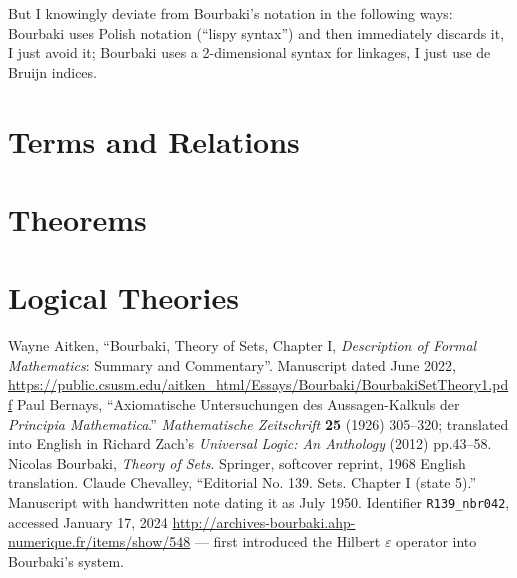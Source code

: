 \documentclass{amsart}
\begin{document}
But I knowingly deviate from Bourbaki's notation in the following ways:
Bourbaki uses Polish notation (``lispy syntax'') and then immediately
discards it, I just avoid it; Bourbaki uses a 2-dimensional syntax for
linkages, I just use de Bruijn indices.

\section{Terms and Relations}






\section{Theorems}





\section{Logical Theories}






\begin{thebibliography}{99}
 Wayne Aitken,
  ``Bourbaki, Theory of Sets, Chapter I, \textit{Description of Formal Mathematics}: Summary and Commentary''.
  Manuscript dated June 2022,
  \url{https://public.csusm.edu/aitken_html/Essays/Bourbaki/BourbakiSetTheory1.pdf}
 Paul Bernays, ``Axiomatische Untersuchungen des
Aussagen-Kalkuls der \textit{Principia Mathematica}.''
\textit{Mathematische Zeitschrift} \textbf{25} (1926) 305--320;
translated into English in Richard Zach's \textit{Universal Logic: An
  Anthology} (2012) pp.43--58.
 Nicolas Bourbaki,
  \textit{Theory of Sets}.
  Springer, softcover reprint, 1968 English translation.
Claude Chevalley, ``Editorial No. 139. Sets. Chapter I (state 5).''
Manuscript with handwritten note dating it as July 1950.
Identifier \verb#R139_nbr042#, accessed January 17, 2024 \url{http://archives-bourbaki.ahp-numerique.fr/items/show/548}
--- first introduced the Hilbert $\varepsilon$ operator into Bourbaki's system.
\end{thebibliography}
\end{document}
